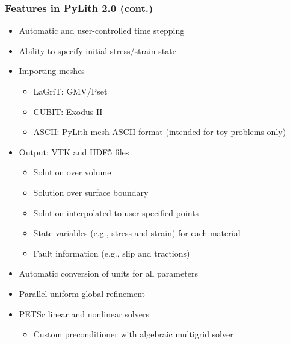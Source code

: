 \documentclass{beamer}
\begin{document}
\begin{frame}
  \frametitle{Features in PyLith 2.0 (cont.)}
  \summary{}

  \begin{itemize}
  \item Automatic and user-controlled time stepping
  \item Ability to specify initial stress/strain state
  \item Importing meshes
    \begin{itemize}
    \item LaGriT: GMV/Pset
    \item CUBIT: Exodus II
    \item ASCII: PyLith mesh ASCII format (intended for toy problems only)
    \end{itemize}
  \item Output: VTK and HDF5 files
    \begin{itemize}
    \item Solution over volume
    \item Solution over surface boundary
    \item Solution interpolated to user-specified points
    \item State variables (e.g., stress and strain) for each material
    \item Fault information (e.g., slip and tractions)
    \end{itemize}
  \item Automatic conversion of units for all parameters
  \item Parallel uniform global refinement
  \item PETSc linear and nonlinear solvers
    \begin{itemize}
    \item Custom preconditioner with algebraic multigrid solver
    \end{itemize}
 \end{itemize}
  
\end{frame}
\end{document}
